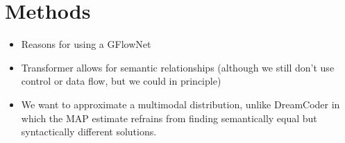 \section{Methods}

\begin{itemize}
    \item Reasons for using a GFlowNet 
    \item Transformer allows for semantic relationships (although we still don't use control or data flow, but we could in principle)
    \item We want to approximate a multimodal distribution, unlike DreamCoder in which the MAP estimate refrains from finding semantically equal but syntactically different solutions.
\end{itemize}



